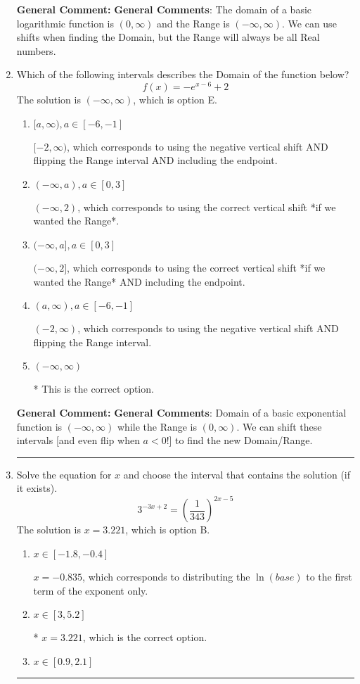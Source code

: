 \documentclass{extbook}[14pt]
\newcommand{\litem}[1]{\item #1

\rule{\textwidth}{0.4pt}}
\begin{document}
\begin{enumerate}
{\textbf{General Comment:} \textbf{General Comments}: The domain of a basic logarithmic function is $(0, \infty)$ and the Range is $(-\infty, \infty)$. We can use shifts when finding the Domain, but the Range will always be all Real numbers.
}
\litem{
Which of the following intervals describes the Domain of the function below?
\[ f(x) = -e^{x-6}+2 \]The solution is \( (-\infty, \infty) \), which is option E.\begin{enumerate}[label=\Alph*.]
\item \( [a, \infty), a \in [-6, -1] \)

$[-2, \infty)$, which corresponds to using the negative vertical shift AND flipping the Range interval AND including the endpoint.
\item \( (-\infty, a), a \in [0, 3] \)

$(-\infty, 2)$, which corresponds to using the correct vertical shift *if we wanted the Range*.
\item \( (-\infty, a], a \in [0, 3] \)

$(-\infty, 2]$, which corresponds to using the correct vertical shift *if we wanted the Range* AND including the endpoint.
\item \( (a, \infty), a \in [-6, -1] \)

$(-2, \infty)$, which corresponds to using the negative vertical shift AND flipping the Range interval.
\item \( (-\infty, \infty) \)

* This is the correct option.
\end{enumerate}

\textbf{General Comment:} \textbf{General Comments}: Domain of a basic exponential function is $(-\infty, \infty)$ while the Range is $(0, \infty)$. We can shift these intervals [and even flip when $a<0$!] to find the new Domain/Range.
}
\litem{
Solve the equation for $x$ and choose the interval that contains the solution (if it exists).
\[ 3^{-3x+2} = \left(\frac{1}{343}\right)^{2x-5} \]The solution is \( x = 3.221 \), which is option B.\begin{enumerate}[label=\Alph*.]
\item \( x \in [-1.8, -0.4] \)

$x = -0.835$, which corresponds to distributing the $\ln(base)$ to the first term of the exponent only.
\item \( x \in [3, 5.2] \)

* $x = 3.221$, which is the correct option.
\item \( x \in [0.9, 2.1] \)


\end{enumerate}}
\end{enumerate}
\end{document}
